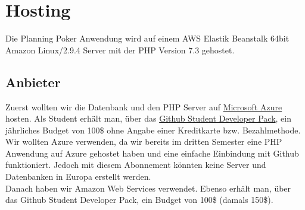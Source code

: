 \chapter{Hosting}
Die Planning Poker Anwendung wird auf einem AWS Elastik Beanstalk 64bit Amazon Linux/2.9.4 Server mit der PHP Version 7.3 gehostet.

\section{Anbieter}
Zuerst wollten wir die Datenbank und den PHP Server auf \href{https://azure.microsoft.com/de-de/}{Microsoft Azure} hosten. Als Student erhält man, über das \href{https://education.github.com/pack}{Github Student Developer Pack}, ein jährliches Budget von 100\$ ohne Angabe einer Kreditkarte bzw. Bezahlmethode. Wir wollten Azure verwenden, da wir bereits im dritten Semester eine PHP Anwendung auf Azure gehostet haben und eine einfache Einbindung mit Github funktioniert. Jedoch mit diesem Abonnement könnten keine Server und Datenbanken in Europa erstellt werden.\\
Danach haben wir Amazon Web Services verwendet. Ebenso erhält man, über das Github Student Developer Pack, ein Budget von 100\$ (damals 150\$).